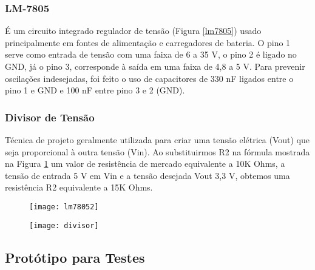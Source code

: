 \documentclass[tcc,capa]{texufpel}
\begin{document}
            \subsubsection{LM-7805}
            
                É um circuito integrado regulador de tensão (Figura \ref{lm7805})  usado principalmente em fontes de alimentação e carregadores de bateria. O pino 1 serve como entrada de tensão com uma faixa de 6 a 35 V, o pino 2 é ligado no GND, já o pino 3, corresponde à saída em uma faixa de 4,8 a 5 V. Para prevenir oscilações indesejadas, foi feito o uso de capacitores de 330 nF ligados entre o pino 1 e GND e 100 nF entre pino 3 e 2 (GND).
    
    
            \subsubsection{Divisor de Tensão}
            
                Técnica de projeto geralmente utilizada para criar uma tensão elétrica (Vout) que seja proporcional à outra tensão (Vin).
                Ao substituirmos R2 na fórmula mostrada na Figura \ref{divisor} um valor de resistência de mercado equivalente a 10K Ohms, a tensão de entrada 5 V em Vin e a tensão desejada Vout 3,3 V, obtemos uma resistência R2 equivalente a 15K Ohms.
                
                
                \begin{figure}[H]
                \centering
                    \begin{minipage}{.45\linewidth}
                      \texttt{[image: lm78052]}
                      \label{lm7805}
                    \end{minipage}
                    \hspace{.05\linewidth}
                    \begin{minipage}{.45\linewidth}
                      \texttt{[image: divisor]}
                      \label{divisor}
                    \end{minipage}
                \end{figure}
    
    
            \subsection{Protótipo para Testes}
            
\end{document}
